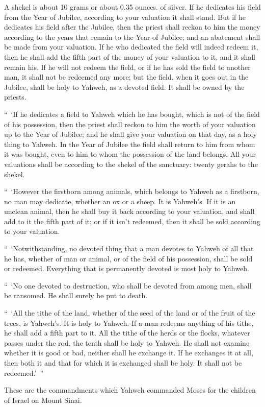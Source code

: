 {{A shekel is about 10 grams or about 0.35 ounces.} of silver.
If he dedicates his field from the Year of Jubilee, according to your valuation it shall stand.
But if he dedicates his field after the Jubilee, then the priest shall reckon to him the money according to the years that remain to the Year of Jubilee; and an abatement shall be made from your valuation.
If he who dedicated the field will indeed redeem it, then he shall add the fifth part of the money of your valuation to it, and it shall remain his.
If he will not redeem the field, or if he has sold the field to another man, it shall not be redeemed any more;
but the field, when it goes out in the Jubilee, shall be holy to Yahweh, as a devoted field. It shall be owned by the priests.
\par }{\PP {}“ ‘If he dedicates a field to Yahweh which he has bought, which is not of the field of his possession,
then the priest shall reckon to him the worth of your valuation up to the Year of Jubilee; and he shall give your valuation on that day, as a holy thing to Yahweh.
In the Year of Jubilee the field shall return to him from whom it was bought, even to him to whom the possession of the land belongs.
All your valuations shall be according to the shekel of the sanctuary: twenty gerahs to the shekel.
\par }{\PP {}“ ‘However the firstborn among animals, which belongs to Yahweh as a firstborn, no man may dedicate, whether an ox or a sheep. It is Yahweh’s.
If it is an unclean animal, then he shall buy it back according to your valuation, and shall add to it the fifth part of it; or if it isn’t redeemed, then it shall be sold according to your valuation.
\par }{\PP {}“ ‘Notwithstanding, no devoted thing that a man devotes to Yahweh of all that he has, whether of man or animal, or of the field of his possession, shall be sold or redeemed. Everything that is permanently devoted is most holy to Yahweh.
\par }{\PP {}“ ‘No one devoted to destruction, who shall be devoted from among men, shall be ransomed. He shall surely be put to death.
\par }{\PP {}“ ‘All the tithe of the land, whether of the seed of the land or of the fruit of the trees, is Yahweh’s. It is holy to Yahweh.
If a man redeems anything of his tithe, he shall add a fifth part to it.
All the tithe of the herds or the flocks, whatever passes under the rod, the tenth shall be holy to Yahweh.
He shall not examine whether it is good or bad, neither shall he exchange it. If he exchanges it at all, then both it and that for which it is exchanged shall be holy. It shall not be redeemed.’ ”
\par }{\PP {}These are the commandments which Yahweh commanded Moses for the children of Israel on Mount Sinai.
\par }